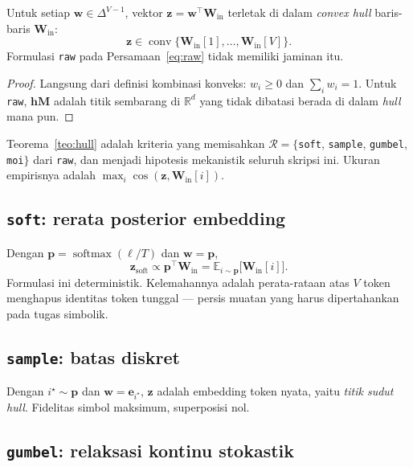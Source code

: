 \documentclass{laporanta1statugm}
\newcommand{\code}[1]{\texttt{#1}}
\begin{document}
\begin{teorema}
\label{teo:hull}
Untuk setiap $\bm{w}\in\Delta^{V-1}$, vektor
$\bm{z} = \bm{w}^{\top}\bm{W}_{\text{in}}$ terletak di dalam
\textit{convex hull} baris-baris $\bm{W}_{\text{in}}$:
\[
  \bm{z}\in\operatorname{conv}\{\bm{W}_{\text{in}}[1],\dots,\bm{W}_{\text{in}}[V]\}.
\]
Formulasi \code{raw} pada Persamaan~\eqref{eq:raw} tidak memiliki jaminan itu.
\end{teorema}

\begin{proof}
Langsung dari definisi kombinasi konveks: $w_i\ge0$ dan $\sum_i w_i = 1$.
Untuk \code{raw}, $\bm{h}\bm{M}$ adalah titik sembarang di $\mathbb{R}^d$ yang
tidak dibatasi berada di dalam \textit{hull} mana pun.
\end{proof}

Teorema~\ref{teo:hull} adalah kriteria yang memisahkan
$\mathcal{R} = \{$\code{soft}, \code{sample}, \code{gumbel}, \code{moi}$\}$
dari \code{raw}, dan menjadi hipotesis mekanistik seluruh skripsi ini.
Ukuran empirisnya adalah $\max_i\cos(\bm{z},\bm{W}_{\text{in}}[i])$.

\subsection{\code{soft}: rerata posterior embedding}

Dengan $\bm{p} = \operatorname{softmax}(\bm{\ell}/T)$ dan $\bm{w} = \bm{p}$,
\begin{equation}
  \bm{z}_{\text{soft}} \propto \bm{p}^{\top}\bm{W}_{\text{in}}
  = \mathbb{E}_{i\sim\bm{p}}\bigl[\bm{W}_{\text{in}}[i]\bigr] .
  \label{eq:soft}
\end{equation}
Formulasi ini deterministik. Kelemahannya adalah perata-rataan atas $V$ token
menghapus identitas token tunggal --- persis muatan yang harus dipertahankan
pada tugas simbolik.

\subsection{\code{sample}: batas diskret}

Dengan $i^\star\sim\bm{p}$ dan $\bm{w} = \bm{e}_{i^\star}$,
$\bm{z}$ adalah embedding token nyata, yaitu \emph{titik sudut}
\textit{hull}. Fidelitas simbol maksimum, superposisi nol.

\subsection{\code{gumbel}: relaksasi kontinu stokastik}
\end{document}
